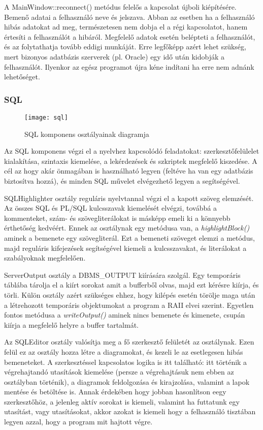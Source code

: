 A MainWindow::reconnect() metódus felelős a kapcsolat újboli kiépítésére. Bemenő adatai a felhasználó neve és jelszava. Abban az esetben ha a felhasználó
hibás adatokat ad meg, természetesen nem dobja el a régi kapcsolatot, hanem értesíti a felhasználót a hibáról. Megfelelő adatok esetén belépteti a felhasználót,
és az folytathatja tovább eddigi munkáját. Erre legfőképp azért lehet szükség, mert bizonyos adatbázis szerverek (pl. Oracle) egy idő után kidobják a felhasználót.
Ilyenkor az egész programot újra kéne indítani ha erre nem adnánk lehetőséget.

\subsubsection{SQL}

\begin{figure}[ht]
  \begin{center}
  \texttt{[image: sql]}
  \end{center}
 \caption{SQL komponens osztályainak diagramja}
\end{figure}

Az SQL komponens végzi el a nyelvhez kapcsolódó feladatokat: szerkesztőfelülelet kialakítása, szintaxis kiemelése, a lekérdezések és szkriptek
megfelelő kiszedése. A cél az hogy akár önmagában is használható legyen (feltéve ha van egy adatbázis biztosítva hozzá), és minden SQL művelet
elvégezhető legyen a segítségével.

SQLHighlighter osztály reguláris nyelvtannal végzi el a kapott szöveg elemzését. Az összes SQL és PL/SQL kulcsszavak\cite{sqlwords} kiemelését
elvégzi, továbbá a kommenteket, szám- és szövegliterálokat is másképp emeli ki a könnyebb érthetőség kedvéért.
Ennek az osztálynak egy metódusa van, a \textit{highlightBlock()} aminek a bemenete egy szövegliterál. Ezt a bemeneti szöveget elemzi a metódus,
majd reguláris kifejezések segítségével kiemeli a kulcsszavakat, és literálokat a szabályoknak megfelelően.

ServerOutput osztály a DBMS\_OUTPUT kiírására szolgál. Egy temporáris táblába tárolja el a kiírt sorokat amit a bufferből olvas, majd ezt kérésre
kiírja, és törli. Külön osztály azért szükséges ehhez, hogy kilépés esetén törölje maga után a létrehozott temporáris objektumokat a program a
RAII elvei szerint. Egyetlen fontos metódusa a \textit{writeOutput()} aminek nincs bemenete és kimenete, csupán kiírja a megfelelő helyre a
buffer tartalmát.

Az SQLEditor osztály valósítja meg a fő szerkesztő felületét az osztálynak. Ezen felül ez az osztály hozza létre a diagramokat, és kezeli le az
esetlegesen hibás bemeneteket. A szerkesztéssel kapcsolatos logika is itt található: itt történik a végrehajtandó utasítások kiemelése (persze a
végrehajtásuk nem ebben az osztályban történik), a diagramok feldolgozása és kirajzolása, valamint a lapok mentése és betöltése is. Annak érdekében
hogy jobban hasonlítson eegy szerkesztőhöz, a jelenleg aktív sorokat is kiemeli, valamint ha futtatunk egy utasítást, vagy utasításokat, akkor azokat
is kiemeli hogy a felhasználó tisztában legyen azzal, hogy a program mit hajtott végre.


